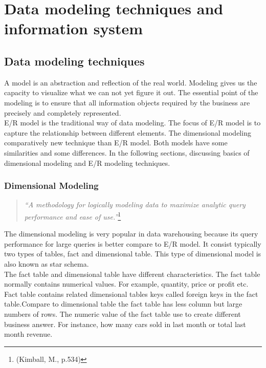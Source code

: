 \chapter{Data modeling techniques and information system }
  
\section{ Data modeling techniques}
A model is an abstraction and reflection of the real world. Modeling gives us the capacity to visualize what we can not yet figure it out. The essential point of the modeling is to ensure that all information objects required by the business are precisely and completely represented.\\

E/R model is the traditional way of data modeling. The focus of E/R model is to capture the relationship between different elements. The dimensional modeling comparatively new technique than E/R model. Both models have some similarities and some differences. In the following sections, discussing basics of dimensional modeling and E/R modeling techniques.



\subsection{Dimensional Modeling}

\begin{quotation}
	\textit{\enquote{A methodology for logically modeling data to maximize analytic query performance and ease of use.}}\footnote{(Kimball, M., p.534)} 
\end{quotation} 
The dimensional modeling is very popular in data warehousing because its query performance for large queries is better compare to E/R model. It consist typically two types of tables, fact and dimensional table. This type of dimensional model is also known as star schema. \\

The fact table and dimensional table have different characteristics.\newline
The fact table normally contains numerical values. For example, quantity, price or profit etc. Fact table contains related dimensional tables keys called foreign keys in the fact table.Compare to dimensional table the fact table has less column but large numbers of rows. The numeric value of the fact table use to create different business answer. For instance, how many cars sold in last month or total last month revenue.\newline

